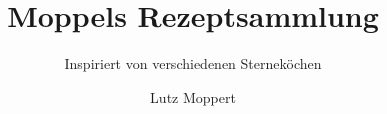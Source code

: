 \documentclass[11pt, a4paper, toc=index, twoside, DIV12, BCOR10mm]{scrbook}
\begin{document}
%
%
\subject{\textcolor{Mahogany}{Gute Küche ganz einfach}}
\title{\textcolor{Mahogany}{Moppels Rezeptsammlung}}
\subtitle{\textcolor{Mahogany}{Inspiriert von verschiedenen Sterneköchen}}
\author{\textcolor{Mahogany}{Lutz Moppert}}
\date{}
\dedication{Gewidmet meiner geliebten Frau Uta und unseren fröhlichen Kindern
  Line und Tim, die alle Rezepte probiert und manchmal gelitten, es jedoch
  meist genossen haben.}
\maketitle
\newpage
\tableofcontents
%
%
\end{document}
